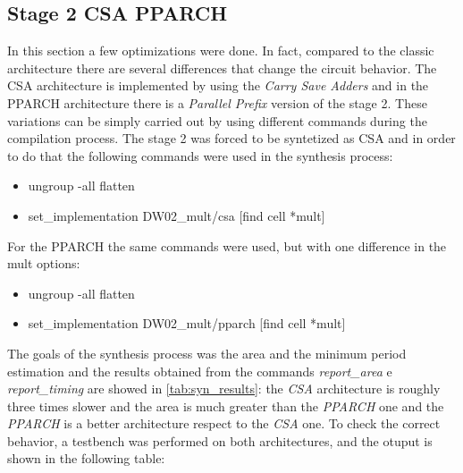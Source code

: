 \subsection{Stage 2 CSA PPARCH}
In this section a few optimizations were done. In fact, compared to the classic architecture there are several differences that change the circuit behavior. The CSA architecture is implemented by using the \textit{Carry Save Adders} and in the PPARCH architecture there is a \textit{Parallel Prefix} version of the stage 2. These variations can be simply carried out by using different commands during the compilation process. The stage 2 was forced to be syntetized as CSA and in order to do that the following commands were used in the synthesis process:
\begin{itemize}
\item ungroup -all flatten
\item set\_implementation DW02\_mult/csa [find cell *mult]
\end{itemize}
For the PPARCH the same commands were used, but with one difference in the mult options:
\begin{itemize}
\item ungroup -all flatten
\item set\_implementation DW02\_mult/pparch [find cell *mult]
\end{itemize}
The goals of the synthesis process was the area and the minimum period estimation and the results obtained from the commands \textit{report\_area} e \textit{report\_timing} are showed in \autoref{tab:syn_results}: the \textit{CSA} architecture is roughly three times slower and the area is much greater than the \textit{PPARCH} one and the \textit{PPARCH} is a better architecture respect to the \textit{CSA} one.
To check the correct behavior, a testbench was performed on both architectures, and the otuput is shown in the following table:

